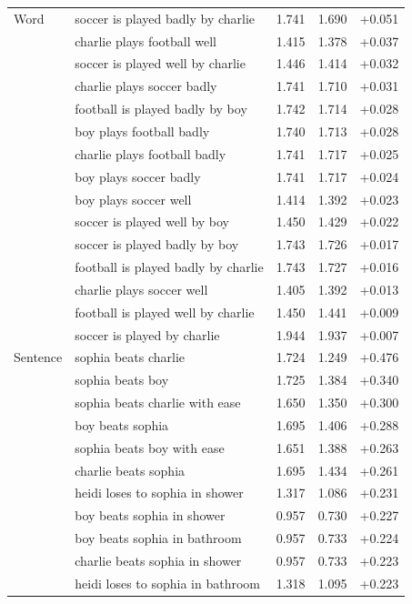 \begin{longtable}{@{}llrrr@{}}
\bottomrule
\endlastfoot
Word & soccer is played badly by charlie & 1.741 & 1.690 & +0.051 \\
 & charlie plays football well & 1.415 & 1.378 & +0.037 \\
 & soccer is played well by charlie & 1.446 & 1.414 & +0.032 \\
 & charlie plays soccer badly & 1.741 & 1.710 & +0.031 \\
 & football is played badly by boy & 1.742 & 1.714 & +0.028 \\
 & boy plays football badly & 1.740 & 1.713 & +0.028 \\
 & charlie plays football badly & 1.741 & 1.717 & +0.025 \\
 & boy plays soccer badly & 1.741 & 1.717 & +0.024 \\
 & boy plays soccer well & 1.414 & 1.392 & +0.023 \\
 & soccer is played well by boy & 1.450 & 1.429 & +0.022 \\
 & soccer is played badly by boy & 1.743 & 1.726 & +0.017 \\
 & football is played badly by charlie & 1.743 & 1.727 & +0.016 \\
 & charlie plays soccer well & 1.405 & 1.392 & +0.013 \\
 & football is played well by charlie & 1.450 & 1.441 & +0.009 \\
 & soccer is played by charlie & 1.944 & 1.937 & +0.007 \\
\addlinespace
Sentence & sophia beats charlie & 1.724 & 1.249 & +0.476 \\
 & sophia beats boy & 1.725 & 1.384 & +0.340 \\
 & sophia beats charlie with ease & 1.650 & 1.350 & +0.300 \\
 & boy beats sophia & 1.695 & 1.406 & +0.288 \\
 & sophia beats boy with ease & 1.651 & 1.388 & +0.263 \\
 & charlie beats sophia & 1.695 & 1.434 & +0.261 \\
 & heidi loses to sophia in shower & 1.317 & 1.086 & +0.231 \\
 & boy beats sophia in shower & 0.957 & 0.730 & +0.227 \\
 & boy beats sophia in bathroom & 0.957 & 0.733 & +0.224 \\
 & charlie beats sophia in shower & 0.957 & 0.733 & +0.223 \\
 & heidi loses to sophia in bathroom & 1.318 & 1.095 & +0.223 \\

\end{longtable}

